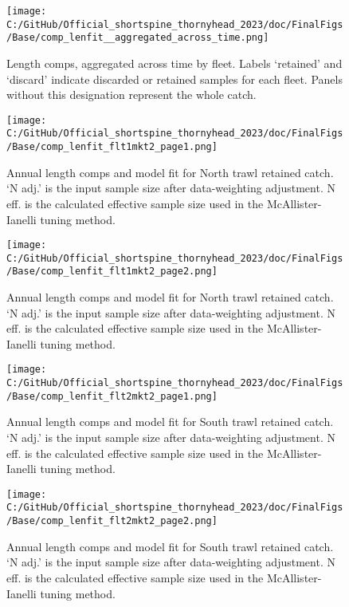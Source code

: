 \documentclass[11pt,
  letterpaper,
]{article}
\begin{document}
\begin{figure}
\centering
\texttt{[image: C:/GitHub/Official\_shortspine\_thornyhead\_2023/doc/FinalFigs/Base/comp\_lenfit\_\_aggregated\_across\_time.png]}
\caption{Length comps, aggregated across time by fleet. Labels `retained' and `discard' indicate discarded or retained samples for each fleet. Panels without this designation represent the whole catch.\label{fig:lencomps_all}}
\end{figure}

\begin{figure}
\centering
\texttt{[image: C:/GitHub/Official\_shortspine\_thornyhead\_2023/doc/FinalFigs/Base/comp\_lenfit\_flt1mkt2\_page1.png]}
\caption{Annual length comps and model fit for North trawl retained catch. `N adj.' is the input sample size after data-weighting adjustment. N eff. is the calculated effective sample size used in the McAllister-Ianelli tuning method.\label{fig:ntrawl_comps_1}}
\end{figure}

\begin{figure}
\centering
\texttt{[image: C:/GitHub/Official\_shortspine\_thornyhead\_2023/doc/FinalFigs/Base/comp\_lenfit\_flt1mkt2\_page2.png]}
\caption{Annual length comps and model fit for North trawl retained catch. `N adj.' is the input sample size after data-weighting adjustment. N eff. is the calculated effective sample size used in the McAllister-Ianelli tuning method.\label{fig:ntrawl_comps_2}}
\end{figure}

\begin{figure}
\centering
\texttt{[image: C:/GitHub/Official\_shortspine\_thornyhead\_2023/doc/FinalFigs/Base/comp\_lenfit\_flt2mkt2\_page1.png]}
\caption{Annual length comps and model fit for South trawl retained catch. `N adj.' is the input sample size after data-weighting adjustment. N eff. is the calculated effective sample size used in the McAllister-Ianelli tuning method.\label{fig:strawl_comps_1}}
\end{figure}

\begin{figure}
\centering
\texttt{[image: C:/GitHub/Official\_shortspine\_thornyhead\_2023/doc/FinalFigs/Base/comp\_lenfit\_flt2mkt2\_page2.png]}
\caption{Annual length comps and model fit for South trawl retained catch. `N adj.' is the input sample size after data-weighting adjustment. N eff. is the calculated effective sample size used in the McAllister-Ianelli tuning method.\label{fig:strawl_comps_2}}
\end{figure}
\end{document}
